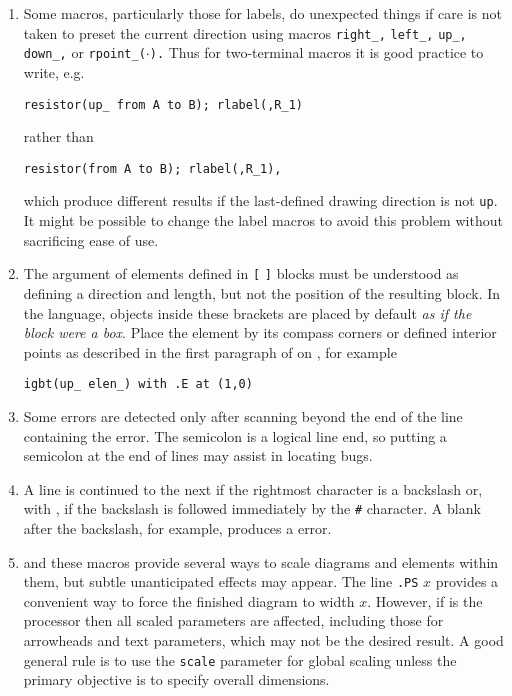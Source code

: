 \begin{enumerate}
{   \verb|Circuit containing planar inductor and capacitor}|
}

\item 
{}
 Some macros, particularly those for labels, do
unexpected things if care is not taken to preset the current direction
using macros {\tt right\_,} {\tt left\_,} {\tt up\_,} {\tt down\_,}
or {\tt rpoint\_($\cdot$).}
Thus for two-terminal macros it is good practice to write, e.g.

{\tt resistor(up\_ from A to B); rlabel(,R\_1)}

\noindent%
rather than 

{\tt resistor(from A to B); rlabel(,R\_1),}

\noindent%
which produce different results if the last-defined drawing direction is not
{\tt up}.  It might be possible to change the label macros to avoid this problem
without sacrificing ease of use.

\item
{}
  The \linespec argument of elements defined in {\tt[} {\tt]}
  blocks must be understood as defining a direction and length, but
  not the position of the resulting block.
  In the \pic language, objects inside these brackets are placed by
  default {\em as if the block were a box}.  Place the
  element by its compass corners or defined interior points
  as described in the first paragraph of  on
  , for example  
  
{\tt igbt(up\_ elen\_) with .E at (1,0)}

\item
{}
 Some errors are detected only after scanning
  beyond the end of the line containing the error.  The semicolon
  is a logical line end, so putting a semicolon at the end of lines may
  assist in locating bugs. 

\item
{}
 A line is continued to the next if the
  rightmost character is a backslash or, with \dpic, if the backslash is
  followed immediately by the {\tt \#} character.
  A blank after the backslash, for example, produces a \pic error.

\item
{}
 \Pic and these macros provide several ways to scale
  diagrams and elements within them, but subtle unanticipated effects
  may appear.  The line {\tt.PS} $x$ provides a convenient way to force
  the finished diagram to width $x.$  However, if \gpic is the
  \pic processor then all scaled parameters are affected, including those
  for arrowheads and text parameters, which may not be the desired
  result.  A good general rule is to use the {\tt scale} parameter for
  global scaling unless the primary objective is to specify overall
  dimensions.


\end{enumerate}
